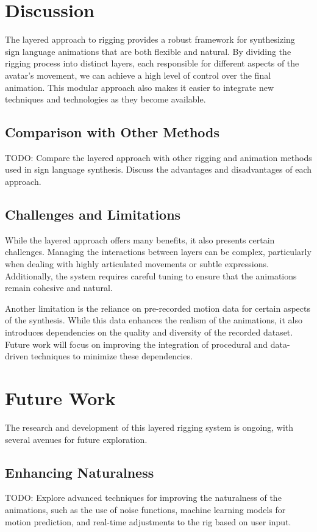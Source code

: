 \documentclass[../../main.tex]{subfiles}
\begin{document}
\section{Discussion}
The layered approach to rigging provides a robust framework for synthesizing sign language animations that are both flexible and natural. By dividing the rigging process into distinct layers, each responsible for different aspects of the avatar's movement, we can achieve a high level of control over the final animation. This modular approach also makes it easier to integrate new techniques and technologies as they become available.

\subsection{Comparison with Other Methods}
TODO: Compare the layered approach with other rigging and animation methods used in sign language synthesis. Discuss the advantages and disadvantages of each approach.

\subsection{Challenges and Limitations}
While the layered approach offers many benefits, it also presents certain challenges. Managing the interactions between layers can be complex, particularly when dealing with highly articulated movements or subtle expressions. Additionally, the system requires careful tuning to ensure that the animations remain cohesive and natural.

Another limitation is the reliance on pre-recorded motion data for certain aspects of the synthesis. While this data enhances the realism of the animations, it also introduces dependencies on the quality and diversity of the recorded dataset. Future work will focus on improving the integration of procedural and data-driven techniques to minimize these dependencies.

\section{Future Work}
The research and development of this layered rigging system is ongoing, with several avenues for future exploration.

\subsection{Enhancing Naturalness}
TODO: Explore advanced techniques for improving the naturalness of the animations, such as the use of noise functions, machine learning models for motion prediction, and real-time adjustments to the rig based on user input.
\end{document}
